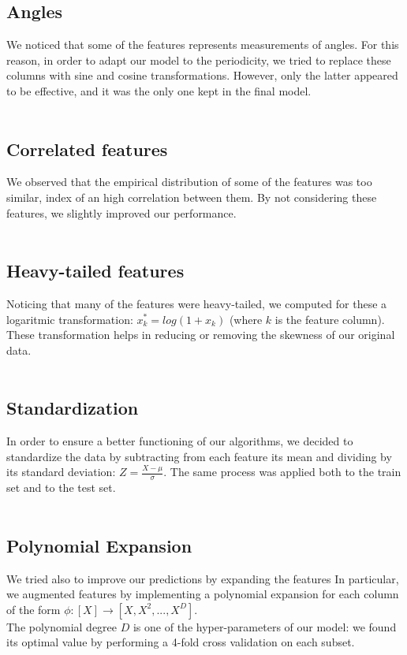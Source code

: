 \documentclass[10pt,conference,compsocconf]{IEEEtran}
\begin{document}
\subsection{Angles}
We noticed that some of the features represents measurements of angles. For this reason, in order to adapt our model to the periodicity, we tried to replace these columns with sine and cosine transformations. However, only the latter appeared to be effective, and it was the only one kept in the final model.\\
\vspace{-0.8cm}\\

\subsection{Correlated features}
We observed that the empirical distribution of some of the features was too similar, index of an high correlation between them. By not considering these features, we slightly improved our performance.\\
\vspace{-0.8cm}\\

\subsection{Heavy-tailed features}
Noticing that many of the features were heavy-tailed, we computed for these a logaritmic transformation: $x_{k}^{*} = log(1+x_k)$ (where $k$ is the feature column). These transformation  helps in reducing or removing the skewness of our original data.\\
\vspace{-0.8cm}\\


\subsection{Standardization}
In order to ensure a better functioning of our algorithms, we decided to standardize the data by subtracting from each feature its mean and dividing by its standard deviation: $Z=\frac{X-\mu}{\sigma}$. The same process was applied both to the train set and to the test set.\\
\vspace{-0.8cm}\\

\subsection{Polynomial Expansion}
We tried also to improve our predictions by expanding the features In particular, we augmented features by implementing a polynomial expansion for each column of the form $\phi:[X]\rightarrow [X,X^2,...,X^D]$.\\
The polynomial degree $D$ is one of the hyper-parameters of our model: we found its optimal value by performing a 4-fold cross validation on each subset.
\end{document}
